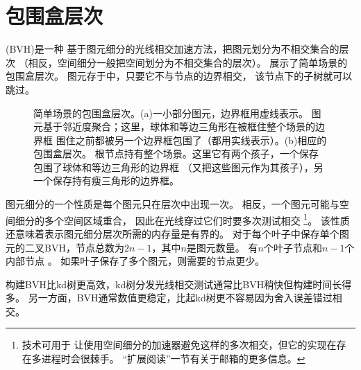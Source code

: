 \section{包围盒层次}\label{sec:包围盒层次}

(BVH)是一种
基于图元细分的光线相交加速方法，把图元划分为不相交集合的层次
（相反，空间细分一般把空间划分为不相交集合的层次）。
展示了简单场景的包围盒层次。
图元存于中，只要它不与节点的边界相交，
该节点下的子树就可以跳过。
\begin{figure}[htbp]
    \centering
    \caption{简单场景的包围盒层次。(a)一小部分图元，边界框用虚线表示。
        图元基于邻近度聚合；这里，球体和等边三角形在被框住整个场景的边界框
        围住之前都被另一个边界框包围了（都用实线表示）。(b)相应的包围盒层次。
        根节点持有整个场景。这里它有两个孩子，一个保存包围了球体和等边三角形的边界框
        （又把这些图元作为其孩子），另一个保存持有瘦三角形的边界框。}
    \label{fig:4.2}
\end{figure}

图元细分的一个性质是每个图元只在层次中出现一次。
相反，一个图元可能与空间细分的多个空间区域重合，
因此在光线穿过它们时要多次测试相交
\footnote{\protect{}技术可用于
    让使用空间细分的加速器避免这样的多次相交，但它的实现在存在多进程时会很棘手。
    “扩展阅读”一节有关于邮箱的更多信息。}。
该性质还意味着表示图元细分层次所需的内存量是有界的。
对于每个叶子中保存单个图元的二叉BVH，节点总数为$2n-1$，其中$n$是图元数量。
有$n$个叶子节点和$n-1$个内部节点
。
如果叶子保存了多个图元，则需要的节点更少。

构建BVH比kd树更高效，kd树分发光线相交测试通常比BVH稍快但构建时间长得多。
另一方面，BVH通常数值更稳定，比起kd树更不容易因为舍入误差错过相交。

